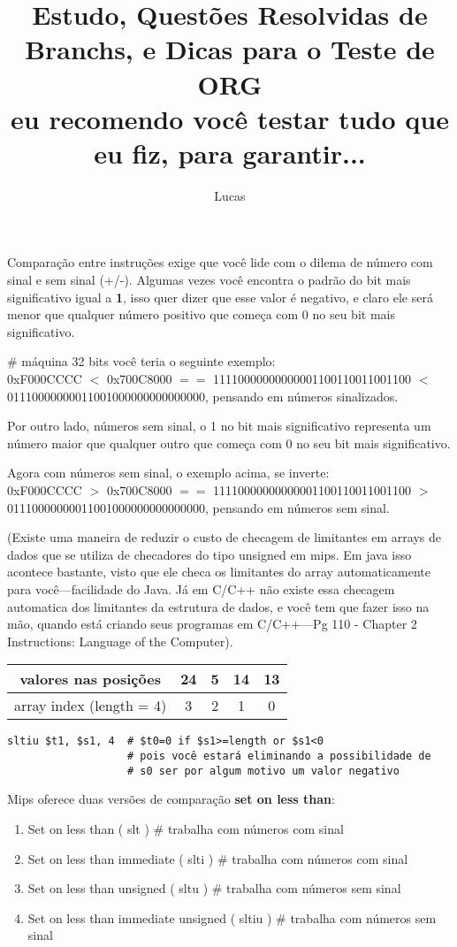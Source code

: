 \documentclass{article}
\author{Lucas}
\title{Estudo, Questões Resolvidas de Branchs, e Dicas para o Teste de ORG\\
\small{eu recomendo você testar tudo que eu fiz, para garantir...}}
\begin{document}
\maketitle

Comparação entre instruções exige que você lide com o dilema de número com sinal
e sem sinal (+/-). Algumas vezes você encontra o padrão do bit mais
significativo igual a \textbf{1}, isso quer dizer que esse valor é negativo, e
claro ele será menor que qualquer número positivo que começa com 0 no seu bit
mais significativo.

\# máquina 32 bits você teria o seguinte exemplo:\\
0xF000CCCC $<$ 0x700C8000 $==$ 11110000000000001100110011001100 $<$
01110000000011001000000000000000, pensando em números sinalizados.

Por outro lado, números sem sinal, o 1 no bit mais significativo representa um
número maior que qualquer outro que começa com 0 no seu bit mais significativo.

Agora com números sem sinal, o exemplo acima, se inverte:\\
0xF000CCCC $>$ 0x700C8000 $==$ 11110000000000001100110011001100 $>$
01110000000011001000000000000000, pensando em números sem sinal.

(Existe uma maneira de reduzir o custo de checagem de limitantes em arrays de
dados que se utiliza de checadores do tipo unsigned em mips. Em java isso
acontece bastante, visto que ele checa os limitantes do array automaticamente
para você---facilidade do Java. Já em C/C++ não existe essa checagem automatica
dos limitantes da estrutura de dados, e você tem que fazer isso na mão, quando
está criando seus programas em C/C++---Pg 110 - Chapter 2  Instructions:
Language of the Computer).

\begin{tabular}{|c|c|c|c|c|}
\hline valores nas posições & 24 & 5 & 14 & 13 \\
\hline array index (length = 4) & 3 & 2 & 1 & 0 \\
\hline
\end{tabular}

\begin{verbatim}
sltiu $t1, $s1, 4  # $t0=0 if $s1>=length or $s1<0
                   # pois você estará eliminando a possibilidade de
                   # s0 ser por algum motivo um valor negativo
\end{verbatim}

Mips oferece duas versões de comparação \textbf{set on less than}:
\begin{enumerate}
\item Set on less than ( slt ) \# trabalha com números com sinal
\item Set on less than immediate ( slti ) \# trabalha com números com sinal

\item Set on less than unsigned ( sltu ) \# trabalha com números sem sinal
\item Set on less than immediate unsigned ( sltiu ) \# trabalha com números sem
sinal
\end{enumerate}
\end{document}
